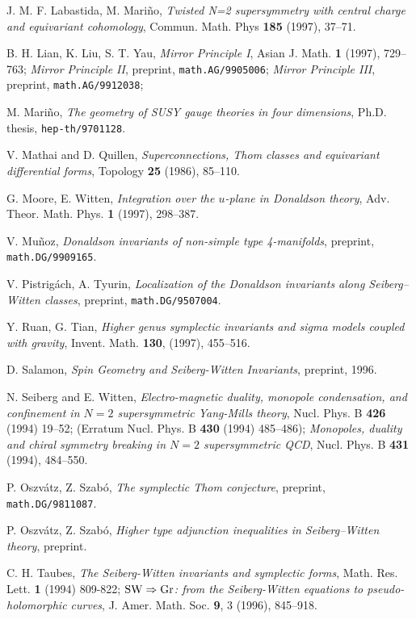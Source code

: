 \documentclass[a4paper,12pt,reqno,sumlimits]{amsart}
\theoremstyle{plain}
\theoremstyle{definition}
\newcommand{\1}{{\bf 1}}
\numberwithin{equation}{section}
\begin{document}
\begin{thebibliography}{999}
 J. M. F. Labastida, M. Mari\~no, {\em Twisted N=2
    supersymmetry with central charge and equivariant cohomology}, Commun.
  Math. Phys {\bf 185} (1997), 37--71.
  
 B. H. Lian, K. Liu, S. T. Yau, {\em Mirror Principle I},
  Asian J. Math. {\bf 1} (1997), 729--763; {\em Mirror Principle II},
  preprint, \texttt{math.AG/9905006}; {\em Mirror Principle III}, preprint,
  \texttt{math.AG/9912038};
  
 M. Mari\~no, {\em The geometry of SUSY gauge theories in four
    dimensions}, Ph.D. thesis, \texttt{hep-th/9701128}.
  
 V. Mathai and D. Quillen, {\em Superconnections, Thom classes
    and equivariant differential forms}, Topology {\bf 25} (1986), 85--110.
  
 G. Moore, E. Witten, {\em Integration over the $u$-plane in
    Donaldson theory}, Adv. Theor. Math. Phys. {\bf 1} (1997), 298--387.
  
 V. Mu\~noz, {\em Donaldson invariants of non-simple type
    4-manifolds}, preprint, \texttt{math.DG/9909165}.
  
 V. Pistrig\'ach, A. Tyurin, {\em Localization of the Donaldson
    invariants along Seiberg--Witten classes}, preprint,
  \texttt{math.DG/9507004}.
  
 Y. Ruan, G. Tian, {\em Higher genus symplectic invariants
    and sigma models coupled with gravity}, Invent. Math. {\bf 130}, (1997),
  455--516.
  
 D. Salamon, {\em Spin Geometry and Seiberg-Witten
    Invariants}, preprint, 1996.
  
 N. Seiberg and E. Witten, {\em Electro-magnetic duality,
    monopole condensation, and confinement in $N=2$ supersymmetric Yang-Mills
    theory}, Nucl. Phys. B {\bf 426} (1994) 19--52; (Erratum Nucl. Phys. B
  {\bf 430} (1994) 485--486); {\em Monopoles, duality and chiral symmetry
    breaking in $N=2$ supersymmetric QCD}, Nucl. Phys. B {\bf 431} (1994),
  484--550.
  
 P. Oszv\'atz, Z. Szab\'o, {\em The symplectic Thom conjecture},
  preprint, \texttt{math.DG/9811087}.
  
 P. Oszv\'atz, Z. Szab\'o, {\em Higher type adjunction
    inequalities in Seiberg--Witten theory}, preprint.
  
 C. H. Taubes, {\em The Seiberg-Witten invariants and
    symplectic forms}, Math. Res. Lett. {\bf 1} (1994) 809-822; {\em ${\rm
      SW}\Rightarrow{\rm Gr}$: from the Seiberg-Witten equations to
    pseudo-holomorphic curves}, J. Amer. Math. Soc. {\bf 9}, 3 (1996),
  845--918.
  

\end{thebibliography}
\end{document}
